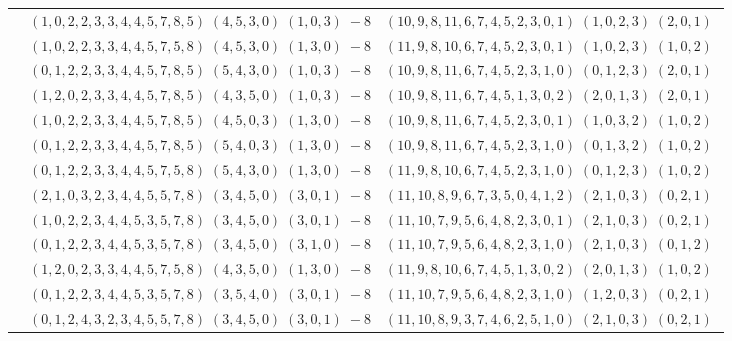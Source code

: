 \documentclass[11pt]{article}
\begin{document}
\begin{longtable}[l]{|c|c|c|}
 \cline{2-3} 
 & $(1 ,0 ,2 ,2 ,3 ,3 ,4 ,4 ,5 ,7 ,8 ,5) \;(4 ,5 ,3 ,0) \;(1 ,0 ,3) \;-8$ & $(10 ,9 ,8 ,11 ,6 ,7 ,4 ,5 ,2 ,3 ,0 ,1) \;(1 ,0 ,2 ,3) \;(2 ,0 ,1) \;$\\ 
 \cline{2-3} 
 & $(1 ,0 ,2 ,2 ,3 ,3 ,4 ,4 ,5 ,7 ,5 ,8) \;(4 ,5 ,3 ,0) \;(1 ,3 ,0) \;-8$ & $(11 ,9 ,8 ,10 ,6 ,7 ,4 ,5 ,2 ,3 ,0 ,1) \;(1 ,0 ,2 ,3) \;(1 ,0 ,2) \;$\\ 
 \cline{2-3} 
 & $(0 ,1 ,2 ,2 ,3 ,3 ,4 ,4 ,5 ,7 ,8 ,5) \;(5 ,4 ,3 ,0) \;(1 ,0 ,3) \;-8$ & $(10 ,9 ,8 ,11 ,6 ,7 ,4 ,5 ,2 ,3 ,1 ,0) \;(0 ,1 ,2 ,3) \;(2 ,0 ,1) \;$\\ 
 \cline{2-3} 
 & $(1 ,2 ,0 ,2 ,3 ,3 ,4 ,4 ,5 ,7 ,8 ,5) \;(4 ,3 ,5 ,0) \;(1 ,0 ,3) \;-8$ & $(10 ,9 ,8 ,11 ,6 ,7 ,4 ,5 ,1 ,3 ,0 ,2) \;(2 ,0 ,1 ,3) \;(2 ,0 ,1) \;$\\ 
 \cline{2-3} 
 & $(1 ,0 ,2 ,2 ,3 ,3 ,4 ,4 ,5 ,7 ,8 ,5) \;(4 ,5 ,0 ,3) \;(1 ,3 ,0) \;-8$ & $(10 ,9 ,8 ,11 ,6 ,7 ,4 ,5 ,2 ,3 ,0 ,1) \;(1 ,0 ,3 ,2) \;(1 ,0 ,2) \;$\\ 
 \cline{2-3} 
 & $(0 ,1 ,2 ,2 ,3 ,3 ,4 ,4 ,5 ,7 ,8 ,5) \;(5 ,4 ,0 ,3) \;(1 ,3 ,0) \;-8$ & $(10 ,9 ,8 ,11 ,6 ,7 ,4 ,5 ,2 ,3 ,1 ,0) \;(0 ,1 ,3 ,2) \;(1 ,0 ,2) \;$\\ 
 \cline{2-3} 
 & $(0 ,1 ,2 ,2 ,3 ,3 ,4 ,4 ,5 ,7 ,5 ,8) \;(5 ,4 ,3 ,0) \;(1 ,3 ,0) \;-8$ & $(11 ,9 ,8 ,10 ,6 ,7 ,4 ,5 ,2 ,3 ,1 ,0) \;(0 ,1 ,2 ,3) \;(1 ,0 ,2) \;$\\ 
 \cline{2-3} 
 & $(2 ,1 ,0 ,3 ,2 ,3 ,4 ,4 ,5 ,5 ,7 ,8) \;(3 ,4 ,5 ,0) \;(3 ,0 ,1) \;-8$ & $(11 ,10 ,8 ,9 ,6 ,7 ,3 ,5 ,0 ,4 ,1 ,2) \;(2 ,1 ,0 ,3) \;(0 ,2 ,1) \;$\\ 
 \cline{2-3} 
 & $(1 ,0 ,2 ,2 ,3 ,4 ,4 ,5 ,3 ,5 ,7 ,8) \;(3 ,4 ,5 ,0) \;(3 ,0 ,1) \;-8$ & $(11 ,10 ,7 ,9 ,5 ,6 ,4 ,8 ,2 ,3 ,0 ,1) \;(2 ,1 ,0 ,3) \;(0 ,2 ,1) \;$\\ 
 \cline{2-3} 
 & $(0 ,1 ,2 ,2 ,3 ,4 ,4 ,5 ,3 ,5 ,7 ,8) \;(3 ,4 ,5 ,0) \;(3 ,1 ,0) \;-8$ & $(11 ,10 ,7 ,9 ,5 ,6 ,4 ,8 ,2 ,3 ,1 ,0) \;(2 ,1 ,0 ,3) \;(0 ,1 ,2) \;$\\ 
 \cline{2-3} 
 & $(1 ,2 ,0 ,2 ,3 ,3 ,4 ,4 ,5 ,7 ,5 ,8) \;(4 ,3 ,5 ,0) \;(1 ,3 ,0) \;-8$ & $(11 ,9 ,8 ,10 ,6 ,7 ,4 ,5 ,1 ,3 ,0 ,2) \;(2 ,0 ,1 ,3) \;(1 ,0 ,2) \;$\\ 
 \cline{2-3} 
 & $(0 ,1 ,2 ,2 ,3 ,4 ,4 ,5 ,3 ,5 ,7 ,8) \;(3 ,5 ,4 ,0) \;(3 ,0 ,1) \;-8$ & $(11 ,10 ,7 ,9 ,5 ,6 ,4 ,8 ,2 ,3 ,1 ,0) \;(1 ,2 ,0 ,3) \;(0 ,2 ,1) \;$\\ 
 \cline{2-3} 
 & $(0 ,1 ,2 ,4 ,3 ,2 ,3 ,4 ,5 ,5 ,7 ,8) \;(3 ,4 ,5 ,0) \;(3 ,0 ,1) \;-8$ & $(11 ,10 ,8 ,9 ,3 ,7 ,4 ,6 ,2 ,5 ,1 ,0) \;(2 ,1 ,0 ,3) \;(0 ,2 ,1) \;$\\ 

\end{longtable}
\end{document}
